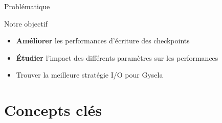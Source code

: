 \documentclass[svgnames,9pt,aspectratio=169]{beamer}
\begin{document}
\begin{frame}{Problématique}
  \begin{block}{Notre objectif}
    \begin{itemize}
      \item \textbf{Améliorer} les performances d'écriture des checkpoints
      \item \textbf{Étudier} l'impact des différents paramètres sur les performances
      \item Trouver la meilleure stratégie I/O pour Gysela
    \end{itemize}
  \end{block}
\end{frame}

\section{Concepts clés}
\frame{\sectionpage}
\end{document}
